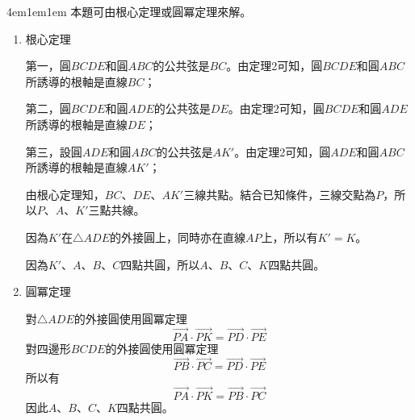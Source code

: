 \documentclass[12pt]{article}
\begin{document}
\begin{mybox}[證明]{4em}{1em}{1em}
    本題可由根心定理或圓冪定理來解。
    \begin{enumerate}[label = 方法 \arabic*：]
        \item 根心定理
        
        第一，圓$BCDE$和圓$ABC$的公共弦是$BC$。由定理2可知，圓$BCDE$和圓$ABC$所誘導的根軸是直線$BC$；

        第二，圓$BCDE$和圓$ADE$的公共弦是$DE$。由定理2可知，圓$BCDE$和圓$ADE$所誘導的根軸是直線$DE$；

        第三，設圓$ADE$和圓$ABC$的公共弦是$AK'$。由定理2可知，圓$ADE$和圓$ABC$所誘導的根軸是直線$AK'$；

        由根心定理知，$BC$、$DE$、$AK'$三線共點。結合已知條件，三線交點為$P$，所以$P$、$A$、$K'$三點共線。

        因為$K'$在$\triangle{ADE}$的外接圓上，同時亦在直線$AP$上，所以有$K'=K$。

        因為$K'$、$A$、$B$、$C$四點共圓，所以$A$、$B$、$C$、$K$四點共圓。
        \item 圓冪定理
        
        對$\triangle{ADE}$的外接圓使用圓冪定理
        $$
            \overrightarrow{PA}\cdot\overrightarrow{PK}=\overrightarrow{PD}\cdot\overrightarrow{PE}
        $$
        對四邊形$BCDE$的外接圓使用圓冪定理
        $$
            \overrightarrow{PB}\cdot\overrightarrow{PC}=\overrightarrow{PD}\cdot\overrightarrow{PE}
        $$
        所以有
        $$
            \overrightarrow{PA}\cdot\overrightarrow{PK}=\overrightarrow{PB}\cdot\overrightarrow{PC}
        $$
        因此$A$、$B$、$C$、$K$四點共圓。
    \end{enumerate}
\end{mybox}
\end{document}
